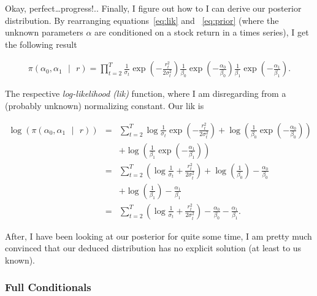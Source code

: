 \documentclass[a4paper,11pt,english]{article}
\begin{document}
		Okay, perfect\ldots progress!.. Finally, I figure out how to I can derive our posterior distribution. By rearranging 
		equations~\ref{eq:lik} and ~\ref{eq:prior}
		(where the unknown parameters $\alpha$ are conditioned on a stock return in a times series), I get the following result 
	
		\begin{eqnarray*}
			\pi\left(\alpha_0, \alpha_1 \text{ }| \text{ } r \right) = \prod_{t=2}^T{\frac{1}{\sigma_t}\exp{\left(-\frac{r^2_t}{2\sigma_t^2} \right)}}					\frac{1}{\beta_0}\exp{\left( -\frac{\alpha_0}{\beta_0}\right)}\frac{1}{\beta_1}\exp{\left(-\frac{\alpha_1}{\beta_1}\right)}. 
		\end{eqnarray*}	 	
	
		The respective \textit{log-likelihood (lik)} function, where I am disregarding from a (probably unknown) normalizing constant. Our lik is

		\begin{eqnarray} \label{eq:posteriori}
			\log{\left( \pi\left(\alpha_0, \alpha_1 \text{ } | \text{ } r \right)\right)} &=& \sum_{t=2}^{T}{\log{\frac{1}{\sigma_t}}
			\exp{\left(-\frac{r^2_t}{2\sigma_t^2} \right)}} + \log{\left(\frac{1}{\beta_0} 
			\exp{\left(-\frac{\alpha_0}{\beta_0} \right)} \right)}\nonumber \\
			&&+ \log{\left(\frac{1}{\beta_1} \exp{\left(-\frac{\alpha_1}{\beta_1} \right)} \right)} \nonumber \\
			&=& \sum_{t=2}^{T}{\left( \log{\frac{1}{\sigma_t} + \frac{r_t^2}{2\sigma_t^2}} \right)} + \log{\left(\frac{1}{\beta_0}\right)} 
			- \frac{\alpha_0}{\beta_0} \nonumber \\
			&&+ \log{\left(\frac{1}{\beta_1} \right)} - \frac{\alpha_1}{\beta_1} \nonumber \\
			&=& \sum_{t=2}^{T}{\left( \log{\frac{1}{\sigma_t} + \frac{r_t^2}{2\sigma_t^2}} \right)} - \frac{\alpha_0}{\beta_0} - 
			\frac{\alpha_1}{\beta_1}.
		\end{eqnarray}	 	
	
		\noindent After, I have been looking at our posterior for quite some time, I am pretty much convinced that our deduced distribution has no 
		explicit solution (at least to us known). 
								
			\subsubsection{Full Conditionals}
	
\end{document}
